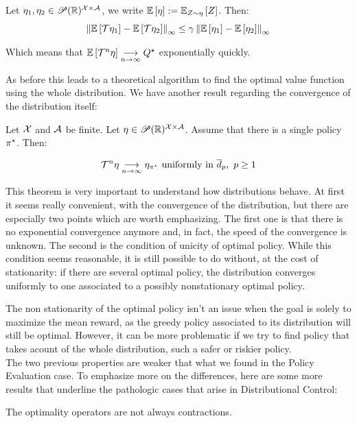 \begin{lemma}
    Let $\eta_1, \eta_2 \in \mathscr{P}(\mathbb{R})^{\mathcal{X}\times\mathcal{A}}$, we write $\mathbb{E}\left[ \eta \right]:= \mathbb{E}_{Z \sim \eta}\left[ Z \right]$. Then:
    \[ \left\lVert\mathbb{E}\left[ \mathcal{T}\eta_1 \right] - \mathbb{E}\left[ \mathcal{T}\eta_2 \right]\right\rVert_\infty \leq \gamma \left\lVert\mathbb{E}\left[ \eta_1 \right] - \mathbb{E}\left[ \eta_2 \right]\right\rVert_\infty \]  

    Which means that $\mathbb{E}\left[ \mathcal{T}^n \eta \right] \underset{n \rightarrow \infty}{\longrightarrow} Q^{\star}$ exponentially quickly.
\end{lemma}

As before this leads to a theoretical algorithm to find the optimal value function using the whole distribution. We have another result regarding the convergence of the distribution itself:

\begin{theorem}
    Let $\mathcal{X}$ and $\mathcal{A}$ be finite. Let $\eta \in \mathscr{P}(\mathbb{R})^{\mathcal{X}\times\mathcal{A}}$. Assume that there is a single policy $\pi^{\star}$. Then: 
    
    \[\mathcal{T}^n \eta \underset{n \rightarrow \infty}{\longrightarrow} \eta_{\pi^{\star}} \text{ uniformly in } \overline{d}_p, \ p\geq1\]
\end{theorem}

This theorem is very important to understand how distributions behave. At first it seems really convenient, with the convergence of the distribution, but there are especially two points which are worth emphasizing. The first one is that there is no exponential convergence anymore and, in fact, the speed of the convergence is unknown. The second is the condition of unicity of optimal policy. While this condition seems reasonable, it is still possible to do without, at the cost of stationarity: if there are several optimal policy, the distribution converges uniformly to one associated to a possibly nonstationary optimal policy.

The non stationarity of the optimal policy isn’t an issue when the goal is solely to maximize the mean reward, as the greedy policy associated to its distribution will still be optimal. However, it can be more problematic if we try to find policy that takes acount of the whole distribution, such a safer or riskier policy.\\

The two previous properties are weaker that what we found in the Policy Evaluation case. To emphasize more on the differences, here are some more results that underline the pathologic cases that arise in Distributional Control:

\begin{proposition}
    The optimality operators are not always contractions.
\end{proposition}

